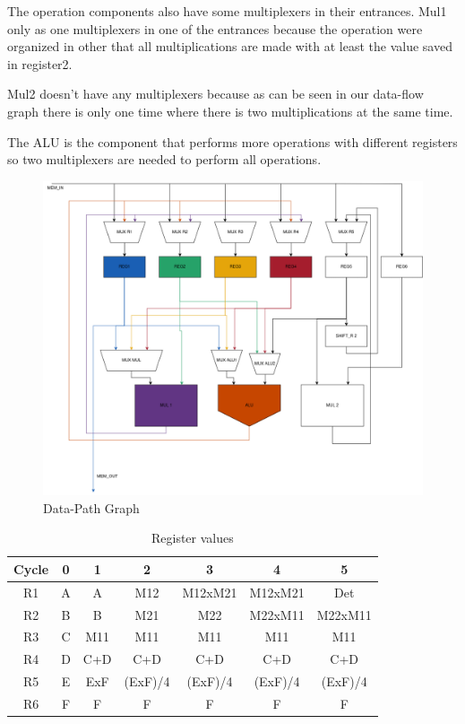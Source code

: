 \documentclass[12pt]{article}
\begin{document}
The operation components also have some multiplexers in their entrances. Mul1 only as one multiplexers in one of the entrances because the operation were organized in other that all multiplications are made with at least the value saved in register2. 

Mul2 doesn't have any multiplexers because as can be seen in our data-flow graph there is only one time where there is two multiplications at the same time.

The ALU is the component that performs more operations with different registers so two multiplexers are needed to perform all operations.

\begin{figure}[H]
	\centering
	\includegraphics[width=0.7\linewidth]{Imagens/Datapath.png}
	\caption{Data-Path Graph}
	\label{fig:path}
\end{figure}

\begin{table}[H]
	\center
	\begin{tabular}{|c|c|c|c|c|c|c|}
		\hline
		Cycle & 0 & 1& 2&3&4&5\\
        \hline
        R1 &A&A&M12&M12xM21&M12xM21&Det\\
        \hline
        R2 &B&B&M21&M22&M22xM11&M22xM11\\
        \hline
        R3&C&M11&M11&M11&M11&M11\\
        \hline
        R4&D&C+D&C+D&C+D&C+D&C+D\\
        \hline
        R5&E&ExF&(ExF)/4&(ExF)/4&(ExF)/4&(ExF)/4\\
        \hline
        R6&F&F&F&F&F&F\\
        \hline
	\end{tabular}
	\caption{Register values}
	\label{tab:reg}
\end{table}
\end{document}
